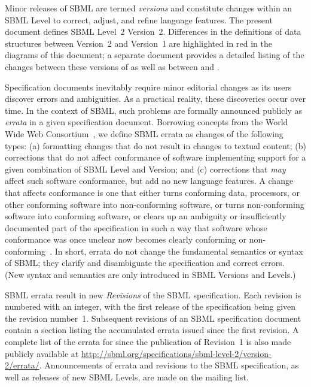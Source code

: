 Minor releases of SBML are termed \emph{versions} and constitute
changes within an SBML Level to correct, adjust, and refine
language features.  The present document defines SBML Level~2
Version~2.  Differences in the definitions of data structures
between Version~2 and Version~1 are highlighted in red in the
diagrams of this document; a separate document provides a detailed
listing of the changes between these versions of \sbmltwo as well
as between \sbmltwotwo and \sbmlonetwo.

Specification documents inevitably require minor editorial changes
as its users discover errors and ambiguities.  As a practical
reality, these discoveries occur over time.  In the context of
SBML, such problems are formally announced publicly as
\emph{errata} in a given specification document.  Borrowing
concepts from the World Wide Web Consortium~\citep{jacobs:2004},
we define SBML errata as changes of the following types: (a)
formatting changes that do not result in changes to textual
content; (b) corrections that do not affect conformance of
software implementing support for a given combination of SBML
Level and Version; and (c) corrections that \emph{may} affect such
software conformance, but add no new language features.  A change
that affects conformance is one that either turns conforming data,
processors, or other conforming software into non-conforming
software, or turns non-conforming software into conforming
software, or clears up an ambiguity or insufficiently documented
part of the specification in such a way that software whose
conformance was once unclear now becomes clearly conforming or
non-conforming~\citep{jacobs:2004}.  In short, errata do not
change the fundamental semantics or syntax of SBML; they clarify
and disambiguate the specification and correct errors.  (New
syntax and semantics are only introduced in SBML Versions and
Levels.)

SBML errata result in new \emph{Revisions} of the SBML
specification.  Each revision is numbered with an integer, with
the first release of the specification being given the revision
number~1.  Subsequent revisions of an SBML specification document
contain a section listing the accumulated errata issued since the
first revision.  A complete list of the errata for \sbmltwotwo
since the publication of Revision~1 is also made publicly
available at
\url{http://sbml.org/specifications/sbml-level-2/version-2/errata/}.
Announcements of errata and revisions to the SBML specification,
as well as releases of new SBML Levels, are made on the
 mailing
list.


